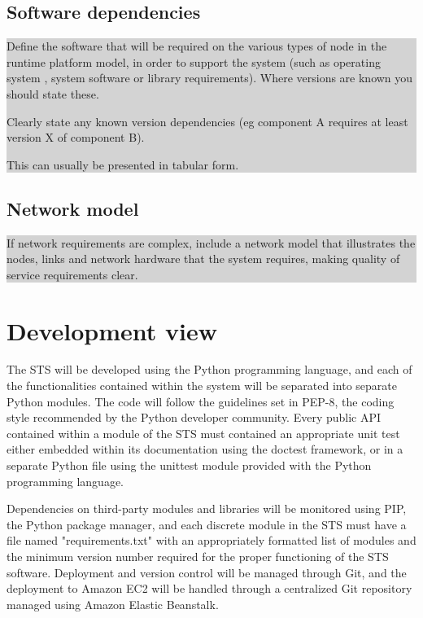 \documentclass[a4paper,11pt]{report}
\newcommand{\instructions}[1]{
  \noindent\colorbox{lightgray}{%
    \parbox{\linewidth}{%
      #1
    }%
  }%
 \vspace{0.1cm}
}
\begin{document}
\subsection{Software dependencies}
\label{sec:softw-depend}

\instructions{
Define the software that will be required on the various types of node
in the runtime platform model, in order to support the system (such as
operating system , system software or library requirements). Where
versions are known you should state these.

Clearly state any known version dependencies (eg component A requires
at least version X of component B).

This can usually be presented in tabular form.
}

\subsection{Network model}
\label{sec:network-model}

\instructions{
If network requirements are complex, include a network model that
illustrates the nodes, links and network hardware that the system
requires, making quality of service requirements clear.
}

\section{Development view}
\label{sec:development-view}

The STS will be developed using the Python programming language, and each of
the functionalities contained within the system will be separated into separate
Python modules. The code will follow the guidelines set in PEP-8, the coding
style recommended by the Python developer community. Every public API contained
within a module of the STS must contained an appropriate unit test either
embedded within its documentation using the doctest framework, or in a separate
Python file using the unittest module provided with the Python programming
language.

Dependencies on third-party modules and libraries will be monitored using PIP,
the Python package manager, and each discrete module in the STS must have a
file named "requirements.txt" with an appropriately formatted list of modules
and the minimum version number required for the proper functioning of the STS
software. Deployment and version control will be managed through Git, and the
deployment to Amazon EC2 will be handled through a centralized Git repository
managed using Amazon Elastic Beanstalk.
\end{document}
